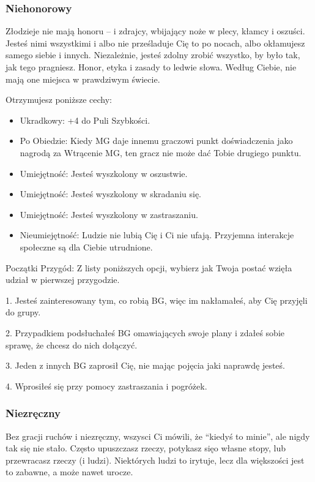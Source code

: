 \subsubsection{Niehonorowy}

Złodzieje nie mają honoru – i zdrajcy, wbijający noże w plecy, kłamcy i oszuści. Jesteś nimi wszystkimi i albo nie prześladuje Cię to po nocach, albo okłamujesz samego siebie i innych. Niezależnie, jesteś zdolny zrobić wszystko, by było tak, jak tego pragniesz. Honor, etyka i zasady to ledwie słowa. Według Ciebie, nie mają one miejsca w prawdziwym świecie.

Otrzymujesz poniższe cechy:
\begin{itemize}
\item  Ukradkowy: +4 do Puli Szybkości.
\item Po Obiedzie: Kiedy MG daje innemu graczowi punkt doświadczenia jako nagrodą za Wtrącenie MG, ten gracz nie może dać Tobie drugiego punktu.
\item  Umiejętność: Jesteś wyszkolony w oszustwie.
\item  Umiejętność: Jesteś wyszkolony w skradaniu się.
\item  Umiejętność: Jesteś wyszkolony w zastraszaniu.
\item  Nieumiejętność: Ludzie nie lubią Cię i Ci nie ufają. Przyjemna interakcje społeczne są dla Ciebie utrudnione. 
 \end{itemize}
    
Początki Przygód: Z listy poniższych opcji, wybierz jak Twoja postać wzięła udział w pierwszej przygodzie.

1. Jesteś zainteresowany tym, co robią BG, więc im nakłamałeś, aby Cię przyjęli do grupy.

2. Przypadkiem podsłuchałeś BG omawiających swoje plany i zdałeś sobie sprawę, że chcesz do nich dołączyć.

3. Jeden z innych BG zaprosił Cię, nie mając pojęcia jaki naprawdę jesteś.

4. Wprosiłeś się przy pomocy zastraszania i pogróżek.

\subsubsection{Niezręczny}

Bez gracji ruchów i niezręczny, wszysci Ci mówili, że “kiedyś to minie”, ale nigdy tak się nie stało. Często upuszczasz rzeczy, potykasz sięo własne stopy, lub przewracasz rzeczy (i ludzi). Niektórych ludzi to irytuje, lecz dla większości jest to zabawne, a może nawet urocze.

